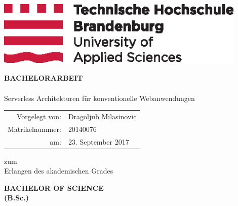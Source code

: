 \documentclass[
12pt,
english,
ngerman,
headsepline,
twoside,
openright,
numbers=noenddot,version=first
]{scrreprt}
\providecommand{\tabularnewline}{\\}
\begin{document}
\titlepage

\begin{center}
\includegraphics[width=12cm]{pics/2015_10_05_THB_Logo_CMYK_randlos}\vspace{0.5cm}

\par\end{center}

\vspace{1cm}

\noindent \begin{center}
\textsf{\textbf{\large BACHELORARBEIT}}\textsf{}\\

\textsf{}\\
\textsf{\huge Serverless Architekturen für konventionelle Webanwendungen}
\par\end{center}{\Large \par}

\vspace{2cm}

\noindent \begin{center}
{\huge }\begin{tabular}{rl}
Vorgelegt von: & Dragoljub Milasinovic\tabularnewline
Matrikelnummer: & 20140076\tabularnewline
am: & 23. September 2017\tabularnewline
\end{tabular}
\par\end{center}{\huge \par}

\vspace{1cm}

\noindent \begin{center}
zum \\
Erlangen des akademischen Grades\textsf{}\\
\par\end{center}
\noindent \begin{center}
\textsf{\textbf{\large BACHELOR OF SCIENCE}}\textsf{\textbf{\LARGE }}\\
\textsf{\textbf{(B.Sc.)}}
\par\end{center}
\end{document}
